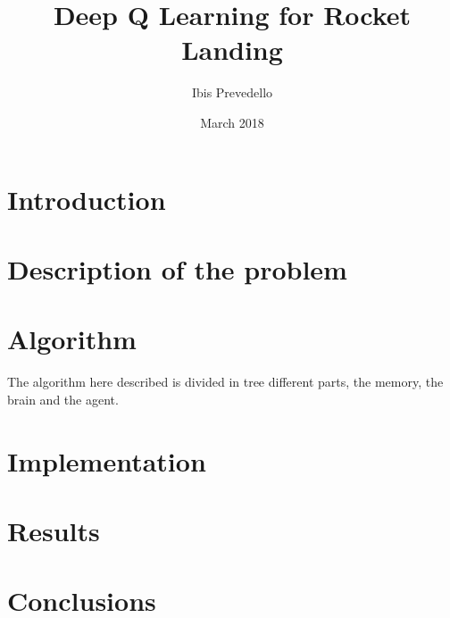 \documentclass{article}
\title{Deep Q Learning for Rocket Landing}
\date{March 2018}
\author{Ibis Prevedello}
\begin{document}
\maketitle

\section{Introduction}

\section{Description of the problem}

\section{Algorithm}
The algorithm here described is divided in tree different parts, the memory, the brain and the agent.


\section{Implementation}

\section{Results}

\section{Conclusions}
\end{document}
